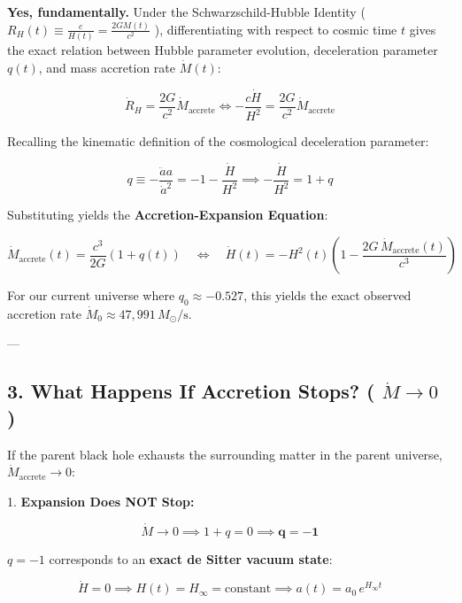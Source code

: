 \documentclass[11pt,a4paper]{article}
\theoremstyle{definition}
\theoremstyle{remark}
\begin{document}
\textbf{Yes, fundamentally.} Under the Schwarzschild-Hubble Identity ( $R_H(t) \equiv \frac{c}{H(t)} = \frac{2GM(t)}{c^2}$ ), differentiating with respect to cosmic time $t$ gives the exact relation between Hubble parameter evolution, deceleration parameter $q(t)$, and mass accretion rate $\dot{M}(t)$:


\begin{equation}
\dot{R}_H = \frac{2G}{c^2} \dot{M}_{\text{accrete}} \iff -\frac{c\dot{H}}{H^2} = \frac{2G}{c^2} \dot{M}_{\text{accrete}}
\end{equation}


Recalling the kinematic definition of the cosmological deceleration parameter:


\begin{equation}
q \equiv -\frac{\ddot{a}a}{\dot{a}^2} = -1 - \frac{\dot{H}}{H^2} \implies -\frac{\dot{H}}{H^2} = 1 + q
\end{equation}


Substituting yields the \textbf{Accretion-Expansion Equation}:


\begin{equation}
\boxed{\dot{M}_{\text{accrete}}(t) = \frac{c^3}{2G} \left( 1 + q(t) \right) \quad \iff \quad \dot{H}(t) = -H^2(t) \left( 1 - \frac{2G \, \dot{M}_{\text{accrete}}(t)}{c^3} \right)}
\end{equation}


For our current universe where $q_0 \approx -0.527$, this yields the exact observed accretion rate $\dot{M}_0 \approx 47,991 \, M_\odot/\mathrm{s}$.

---

\subsection{3. What Happens If Accretion Stops? ( $\dot{M} \to 0$ )}

If the parent black hole exhausts the surrounding matter in the parent universe, $\dot{M}_{\text{accrete}} \to 0$:

1. \textbf{Expansion Does NOT Stop:}


\begin{equation}
\dot{M} \to 0 \implies 1 + q = 0 \implies \mathbf{q = -1}
\end{equation}


$q = -1$ corresponds to an \textbf{exact de Sitter vacuum state}:


\begin{equation}
\dot{H} = 0 \implies H(t) = H_{\infty} = \text{constant} \implies a(t) = a_0 \, e^{H_\infty t}
\end{equation}
\end{document}
